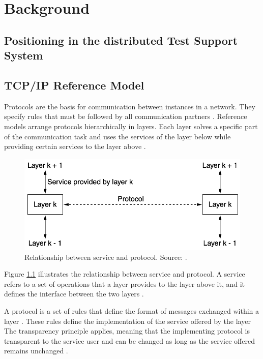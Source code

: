 \chapter{Background}


\section{Positioning in the distributed Test Support System}


\section{TCP/IP Reference Model}

Protocols are the basis for communication between instances in a network. They specify rules that must be followed by all communication partners \cite{Tanenbaum2010}. Reference models arrange protocols hierarchically in layers. Each layer solves a specific part of the communication task and uses the services of the layer below while providing certain services to the layer above \cite{Weigel2021}.

\begin{figure}
    \centering
    \includegraphics[width=0.7\linewidth]{figures/tcpip_refmodel/image1.png}
    \caption[Relationship between service and protocol]{Relationship between service and protocol. Source: \cite{Tanenbaum2010}.}
    \label{fig:ServiceProtRelation}
\end{figure}

Figure \ref{fig:ServiceProtRelation} illustrates the relationship between service and protocol. A service refers to a set of operations that a layer provides to the layer above it, and it defines the interface between the two layers \cite{Tanenbaum2010}.

A protocol is a set of rules that define the format of messages exchanged within a layer \cite{Tanenbaum2010}. These rules define the implementation of the service offered by the layer The transparency principle applies, meaning that the implementing protocol is transparent to the service user and can be changed as long as the service offered remains unchanged \cite{Weigel2021}.

